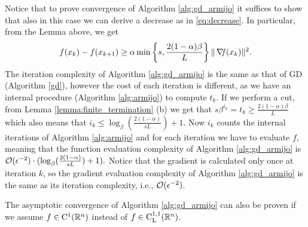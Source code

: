 \documentclass[10pt,a4paper]{article}
\begin{document}
\noindent Notice that to prove convergence of Algorithm \ref{alg:gd_armijo} it suffices to show that also in this case we can derive a decrease as in \eqref{eq:decrease}. In particular, from the Lemma above, we get
\begin{equation*}
	f(x_k) - f(x_{k+1}) \geq \alpha  \min \left \{s, \frac{2(1-\alpha)\beta}{L} \right \} \| \operatorname*{\mathit{\nabla \!f}}(x_k)\|^2.
\end{equation*}
The iteration complexity of Algorithm \ref{alg:gd_armijo} is the same as that of GD (Algorithm \ref{gd}), however the cost of each iteration is different, as we have an internal procedure (Algorithm \ref{alg:armijo}) to compute $t_k$. If we perform a cut, from Lemma \ref{lemma:finite_termination} (b) we get that  $s\beta^{i_k}=t_k \geq \frac{2(1-\alpha)\beta}{L}$ which also means that $i_k\leq \log_\beta (\frac{2(1-\alpha)}{sL}) + 1$. Now $i_k$ counts the internal iterations of Algorithm \ref{alg:armijo} and for each iteration we have to evaluate $f$, meaning that the function evaluation complexity of Algorithm \ref{alg:gd_armijo} is $\mathcal{O}(\epsilon^{-2})\cdot (\log_\beta (\frac{2(1-\alpha)}{sL}) + 1).$ Notice that the gradient is calculated only once at iteration $k$, so the gradient evaluation complexity of Algorithm \ref{alg:gd_armijo} is the same as its iteration complexity, i.e., $\mathcal{O}(\epsilon^{-2})$.\\
\par The asymptotic convergence of Algorithm \ref{alg:gd_armijo} can also be proven if we assume $f\in \mathord{\mathrm{C^1}}(\mathbb{R}^n)$ instead of $f\in \mathord{\mathrm{C^{1,1}_{L}}}(\mathbb{R}^n)$.
\end{document}
